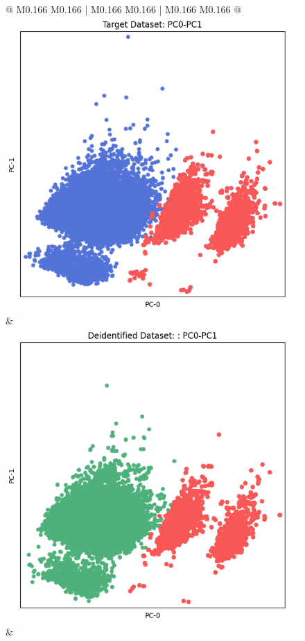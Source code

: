 \begin{figure}[p!]
\begin{tabular}{@{} M{0.166\textwidth} M{0.166\textwidth} | M{0.166\textwidth} M{0.166\textwidth} | M{0.166\textwidth} M{0.166\textwidth} @{}}
       \includegraphics[width=\linewidth]{z_SMOTE.orig.png} &
       \includegraphics[width=\linewidth]{z_SMOTE.syn.png} \\ 
 &

\end{tabular}
\end{figure}
